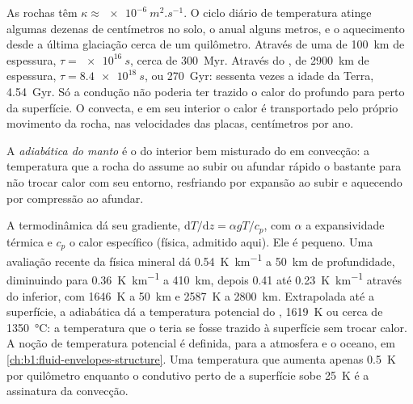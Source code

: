 As rochas têm $\kappa \approx \qty{e-6}{m^2.s^{-1}}$. O ciclo diário de temperatura
atinge algumas dezenas de centímetros no solo, o anual alguns metros, e
o aquecimento desde a última glaciação cerca de um quilômetro. Através de uma 
de \qty{100}{km} de espessura, $\tau = \qty{e16}{s}$, cerca de \qty{300}{Myr}. Através do
, de \qty{2900}{km} de espessura, $\tau = \qty{8.4e18}{s}$, ou \qty{270}{Gyr}: sessenta
vezes a idade da Terra, \qty{4.54}{Gyr}. %
Só a condução não poderia ter trazido o calor do  profundo para perto
da superfície. O  convecta, e em seu interior o calor é transportado
pelo próprio movimento da rocha, nas velocidades das placas, centímetros por
ano. %

\begin{definition}\label{def:b1:heat-budget:adiabat}
A \emph{adiabática do manto} é o  do
interior bem misturado do  em convecção: a temperatura que a rocha do 
assume ao subir ou afundar rápido o bastante para não trocar calor com seu
entorno, resfriando por expansão ao subir e aquecendo por compressão ao
afundar.
\end{definition}

A termodinâmica dá seu gradiente, $\mathrm dT/\mathrm dz = \alpha g T/c_p$,
com $\alpha$ a expansividade térmica e $c_p$ o calor específico (física,
admitido aqui). Ele é pequeno. Uma avaliação recente da física mineral dá
\qty{0.54}{K.km^{-1}} a \qty{50}{km} de profundidade, diminuindo para \qty{0.36}{K.km^{-1}}
a \qty{410}{km}, depois 0.41 até \qty{0.23}{K.km^{-1}} através do  inferior,
com \qty{1646}{K} a \qty{50}{km} e \qty{2587}{K} a \qty{2800}{km}.
Extrapolada até a superfície, a adiabática dá a temperatura potencial do ,
\qty{1619}{K} ou cerca de \qty{1350}{\degreeCelsius}: a temperatura
que o  teria se fosse trazido à superfície sem trocar
calor. A noção de temperatura potencial é definida, para a atmosfera e
o oceano, em \cref{ch:b1:fluid-envelopes-structure}. Uma temperatura que
aumenta apenas \qty{0.5}{K} por quilômetro enquanto o  condutivo perto de
a superfície sobe \qty{25}{K} é a assinatura da convecção.

